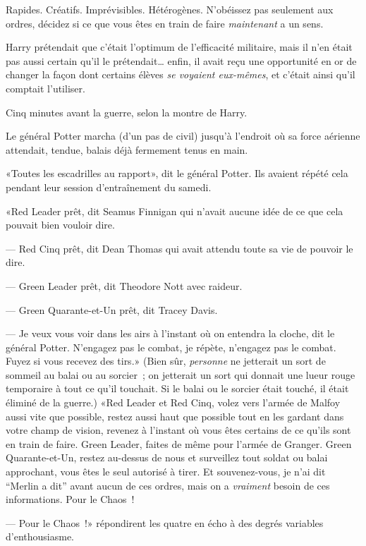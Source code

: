 Rapides. Créatifs. Imprévisibles. Hétérogènes. N'obéissez pas seulement aux ordres, décidez si ce que vous êtes en train de faire \emph{maintenant} a un sens.

Harry prétendait que c'était l'optimum de l'efficacité militaire, mais il n'en était pas aussi certain qu'il le prétendait… enfin, il avait reçu une opportunité en or de changer la façon dont certains élèves \emph{se voyaient eux-mêmes}, et c'était ainsi qu'il comptait l'utiliser.

Cinq minutes avant la guerre, selon la montre de Harry.

Le général Potter marcha (d'un pas de civil) jusqu'à l'endroit où sa force aérienne attendait, tendue, balais déjà fermement tenus en main.

«Toutes les escadrilles au rapport», dit le général Potter. Ils avaient répété cela pendant leur session d'entraînement du samedi.

«Red Leader prêt, dit Seamus Finnigan qui n'avait aucune idée de ce que cela pouvait bien vouloir dire.

--- Red Cinq prêt, dit Dean Thomas qui avait attendu toute sa vie de pouvoir le dire.

--- Green Leader prêt, dit Theodore Nott avec raideur.

--- Green Quarante-et-Un prêt, dit Tracey Davis.

--- Je veux vous voir dans les airs à l'instant où on entendra la cloche, dit le général Potter. N'engagez pas le combat, je répète, n'engagez pas le combat. Fuyez si vous recevez des tirs.» (Bien sûr, \emph{personne} ne jetterait un sort de sommeil au balai ou au sorcier~; on jetterait un sort qui donnait une lueur rouge temporaire à tout ce qu'il touchait. Si le balai ou le sorcier était touché, il était éliminé de la guerre.) «Red Leader et Red Cinq, volez vers l'armée de Malfoy aussi vite que possible, restez aussi haut que possible tout en les gardant dans votre champ de vision, revenez à l'instant où vous êtes certains de ce qu'ils sont en train de faire. Green Leader, faites de même pour l'armée de Granger. Green Quarante-et-Un, restez au-dessus de nous et surveillez tout soldat ou balai approchant, vous êtes le seul autorisé à tirer. Et souvenez-vous, je n'ai dit “Merlin a dit” avant aucun de ces ordres, mais on a \emph{vraiment} besoin de ces informations. Pour le Chaos~!

--- Pour le Chaos~!» répondirent les quatre en écho à des degrés variables d'enthousiasme.

